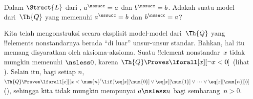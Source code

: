 \documentclass[../../../include/open-logic-section]{subfiles}
\begin{document}
\begin{prob}
Dalam $\Struct{L}$ dari ,
$a^\nssucc = a$ dan $b^\nssucc = b$. Adakah suatu model dari~$\Th{Q}$
yang memenuhi $a^\nssucc = b$ dan $b^\nssucc = a$?
\end{prob}

\begin{explain}
Kita telah mengonstruksi secara eksplisit model-model dari~$\Th{Q}$ yang
!!{element}s nonstandarnya berada ``di luar'' unsur-unsur standar. Bahkan,
hal itu memang disyaratkan oleh aksioma-aksioma. Suatu !!{element}
nonstandar~$x$ tidak mungkin memenuhi ${} \nsless 0$, karena
$\Th{Q} \Proves \lforall[x][\lnot x<0]$ (lihat
). Selain itu, bagi setiap $n$,
$\Th{Q} \Proves \lforall[x][(x < \num{n}' \lif
(\eq[x][\num{0}] \lor \eq[x][\num{1}] \lor \dots \lor
\eq[x][\num{n}]))]$ (), sehingga kita
tidak mungkin mempunyai $a \nsless n$ bagi sembarang~$n>0$.
\end{explain}
\end{document}
